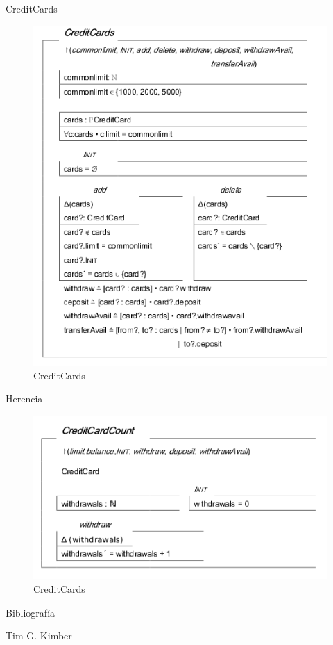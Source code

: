 \documentclass{beamer}
\begin{document}
\begin{frame}{CreditCards}
  \begin{figure}
      \centering
      \includegraphics[scale=0.3]{Z11.png}
      \caption{CreditCards}
      \label{Tarjetas de Credito}
  \end{figure}
\end{frame}


\begin{frame}{Herencia}
 \begin{figure}
      \centering
      \includegraphics[scale=0.5]{Z12.png}
      \caption{CreditCards}
      \label{Tarjetas de Credito}
  \end{figure}
\end{frame}

\begin{frame}{Bibliografía}
  \begin{thebibliography}{10}
  \beamertemplatebookbibitems
    Tim G. Kimber
  \end{thebibliography}
\end{frame}
\end{document}

